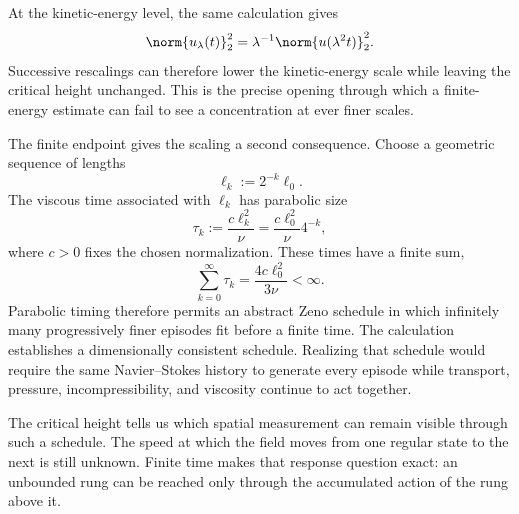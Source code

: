 At the kinetic-energy level, the same calculation gives
\[
  \norm{u_\lambda(t)}_2^2
  =
  \lambda^{-1}
  \norm{u(\lambda^2t)}_2^2.
\]
Successive rescalings can therefore lower the kinetic-energy scale while leaving the critical height unchanged.
This is the precise opening through which a finite-energy estimate can fail to see a concentration at ever finer scales.

The finite endpoint gives the scaling a second consequence.
Choose a geometric sequence of lengths
\[
  \ell_k
  :=
  2^{-k}\ell_0.
\]
The viscous time associated with \(\ell_k\) has parabolic size
\[
  \tau_k
  :=
  \frac{c\ell_k^2}{\nu}
  =
  \frac{c\ell_0^2}{\nu}4^{-k},
\]
where \(c>0\) fixes the chosen normalization.
These times have a finite sum,
\[
  \sum_{k=0}^{\infty}\tau_k
  =
  \frac{4c\ell_0^2}{3\nu}
  <
  \infty.
\]
Parabolic timing therefore permits an abstract Zeno schedule in which infinitely many progressively finer episodes fit before a finite time.
The calculation establishes a dimensionally consistent schedule.
Realizing that schedule would require the same Navier--Stokes history to generate every episode while transport, pressure, incompressibility, and viscosity continue to act together.

The critical height tells us which spatial measurement can remain visible through such a schedule.
The speed at which the field moves from one regular state to the next is still unknown.
Finite time makes that response question exact: an unbounded rung can be reached only through the accumulated action of the rung above it.
